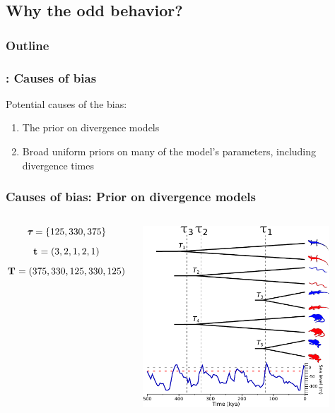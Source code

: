 \subsection{Why the odd behavior?}

\begin{frame}
\frametitle{Outline}
\end{frame}

\begin{frame}
    \frametitle{\msb: Causes of bias}
    Potential causes of the bias:
    \begin{enumerate}
        \item The prior on divergence models
        \item Broad uniform priors on many of the model's parameters, including
            divergence times
    \end{enumerate}
\end{frame}

\begin{frame}
    \frametitle{Causes of bias: Prior on divergence models}
    \begin{columns}[c]
            \begin{displaybox}[4.5cm]
                {\small
                \vspace{0.7mm}
                \[
                    \boldsymbol{\tau_{}} = \{125,330,375\}
                \]\vspace{0mm}
                }
                \[
                    \mathbf{t_{}} = (3,2,1,2,1)
                \]\vspace{0mm}
                {\small
                \[
                    \mathbf{T_{}} = (375,330,125,330,125)
                \]\vspace{0mm}
                }
            \end{displaybox}
            \includegraphics[height=6.8cm]{images/sea-level-prediction-trees-labels-compact-alt2.pdf}
    \end{columns}
\end{frame}


